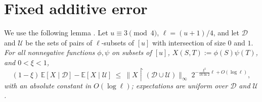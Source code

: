 \documentclass[11pt]{amsart}
\theoremstyle{plain}
\theoremstyle{definition}
\theoremstyle{remark}
\newcommand{\E}{\mathbb{E}}
\begin{document}
\section{Fixed additive error}\label{sec:abs}

We use the following lemma \cite[Lemma~4]{BFPS}. Let $u\equiv3\pmod4$, $\ell=(u+1)/4$, and let $\mathcal D$ and
$\mathcal U$ be the sets of pairs of $\ell$-subsets of $[u]$ with intersection of size $0$ and $1$. \emph{For all
nonnegative functions $\phi,\psi$ on subsets of $[u]$, $X(S,T):=\phi(S)\psi(T)$, and $0<\xi<1$,}
\begin{equation}\label{eq:bfps}
 (1-\xi)\,\E[X\mid\mathcal D]-\E[X\mid\mathcal U]\ \le\ \|X\!\restriction\!(\mathcal D\cup\mathcal U)\|_\infty\;
   2^{-\frac{\xi^2}{16\ln2}\ell+O(\log\ell)},
\end{equation}
\emph{with an absolute constant in $O(\log\ell)$; expectations are uniform over $\mathcal D$ and $\mathcal U$.}
\end{document}
